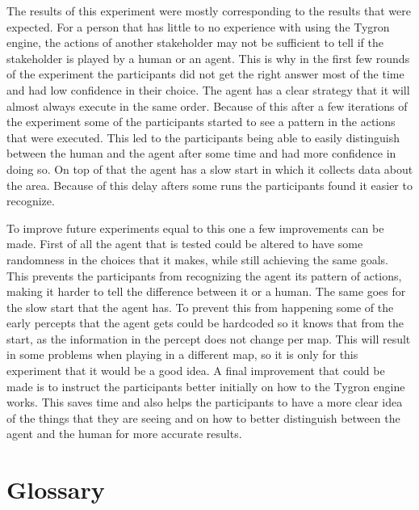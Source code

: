 The results of this experiment were mostly corresponding to the results that were expected. For a person that has little to no experience with using the Tygron engine, the actions of another stakeholder may not be sufficient to tell if the stakeholder is played by a human or an agent. This is why in the first few rounds of the experiment the participants did not get the right answer most of the time and had low confidence in their choice. 
 The agent has a clear strategy that it will almost always execute in the same order. Because of this after a few iterations of the experiment some of the participants started to see a pattern in the actions that were executed. This led to the participants being able to easily distinguish between the human and the agent after some time and had more confidence in doing so. On top of that the agent has a slow start in which it collects data about the area. Because of this delay afters some runs the participants found it easier to recognize. 

To improve future experiments equal to this one a few improvements can be made. First of all the agent that is tested could be altered to have some randomness in the choices that it makes, while still achieving the same goals. This prevents the participants from recognizing the agent its pattern of actions, making it harder to tell the difference between it or a human. The same goes for the slow start that the agent has. To prevent this from happening some of the early percepts that the agent gets could be hardcoded so it knows that from the start, as the information in the percept does not change per map. This will result in some problems when playing in a different map, so it is only for this experiment that it would be a good idea. A final improvement that could be made is to instruct the participants better initially on how to the Tygron engine works. This saves time and also helps the participants to have a more clear idea of the things that they are seeing and on how to better distinguish between the agent and the human for more accurate results.

\newpage

\chapter{Glossary}\label{ch:G}

